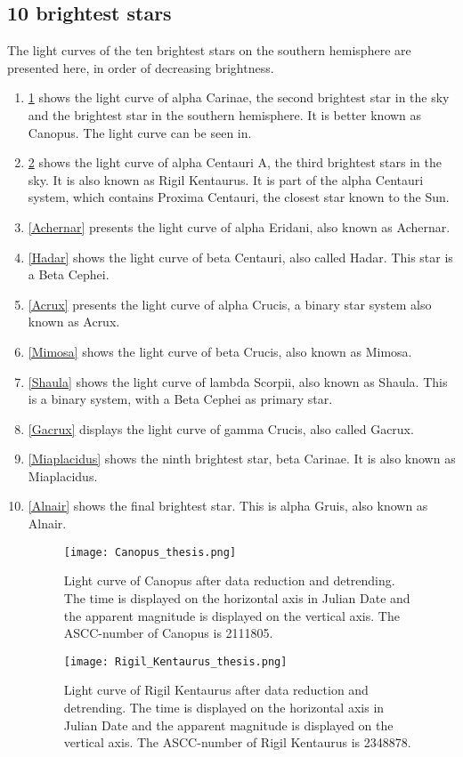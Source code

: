 \documentclass{aa}
\begin{document}
\subsection{10 brightest stars}
The light curves of the ten brightest stars on the southern hemisphere are presented here, in order of decreasing brightness. 
\begin{enumerate}
\item \ref{Canopus} shows the light curve of alpha Carinae, the second brightest star in the sky and the brightest star in the southern hemisphere. It is better known as Canopus. The light curve can be seen in.
\item \ref{Rigil_Kentaurus} shows the light curve of alpha Centauri A, the third brightest stars in the sky. It is also known as Rigil Kentaurus. It is part of the alpha Centauri system, which contains Proxima Centauri, the closest star known to the Sun. 
\item \ref{Achernar} presents the light curve of alpha Eridani, also known as Achernar.
\item \ref{Hadar} shows the light curve of beta Centauri, also called Hadar. This star is a Beta Cephei.
\item \ref{Acrux} presents the light curve of alpha Crucis, a binary star system also known as Acrux.
\item \ref{Mimosa} shows the light curve of beta Crucis, also known as Mimosa.
\item \ref{Shaula} shows the light curve of lambda Scorpii, also known as Shaula. This is a binary system, with a Beta Cephei as primary star.
\item \ref{Gacrux} displays the light curve of gamma Crucis, also called Gacrux.
\item \ref{Miaplacidus} shows the ninth brightest star, beta Carinae. It is also known as Miaplacidus.
\item \ref{Alnair} shows the final brightest star. This is alpha Gruis, also known as Alnair.

\begin{figure}
    \centering
    \texttt{[image: Canopus\_thesis.png]}
    \caption{Light curve of Canopus after data reduction and detrending. The time is displayed on the horizontal axis in Julian Date and the apparent magnitude is displayed on the vertical axis. The ASCC-number of Canopus is 2111805.}
    \label{Canopus}
\end{figure}

\begin{figure}
    \centering
    \texttt{[image: Rigil\_Kentaurus\_thesis.png]}
    \caption{Light curve of Rigil Kentaurus after data reduction and detrending. The time is displayed on the horizontal axis in Julian Date and the apparent magnitude is displayed on the vertical axis. The ASCC-number of Rigil Kentaurus is 2348878.}
    \label{Rigil_Kentaurus}
\end{figure}


\end{enumerate}
\end{document}
